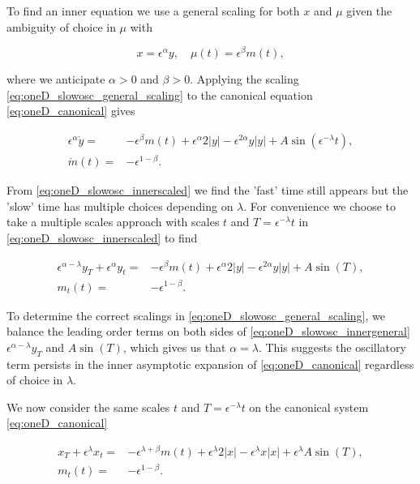 To find an inner equation we use a general scaling for both $x$ and $\mu$ given the ambiguity of choice in $\mu$ with

\begin{equation}\label{eq:oneD_slowosc_general_scaling}
x=\epsilon^\alpha y ,\quad \mu(t)=\epsilon^\beta m(t),
\end{equation}

where we anticipate $\alpha>0$ and $\beta>0$. Applying the scaling \eqref{eq:oneD_slowosc_general_scaling} to the canonical equation \eqref{eq:oneD_canonical} gives

\begin{equation}\label{eq:oneD_slowosc_innerscaled}
\begin{aligned}
\epsilon^\alpha \dot{y}=& -\epsilon^\beta m(t)+\epsilon^\alpha 2|y| - \epsilon^{2\alpha}y|y| +A\sin(\epsilon^{-\lambda}t),\\
\dot{m}(t)=&-\epsilon^{1-\beta}.
\end{aligned}
\end{equation}

From \eqref{eq:oneD_slowosc_innerscaled} we find the 'fast' time still appears but the 'slow' time has multiple choices depending on $\lambda$. For convenience we choose to take a multiple scales approach with scales $t$ and $T=\epsilon^{-\lambda}t$ in \eqref{eq:oneD_slowosc_innerscaled} to find

\begin{equation}\label{eq:oneD_slowosc_innergeneral}
\begin{aligned}
\epsilon^{\alpha-\lambda} y_T+\epsilon^{\alpha}y_t=& -\epsilon^{\beta}m(t)+\epsilon^{\alpha}2|y|-\epsilon^{2\alpha}y|y|+A\sin(T),\\
m_t(t)=&-\epsilon^{1-\beta}.
\end{aligned}
\end{equation}

To determine the correct scalings in \eqref{eq:oneD_slowosc_general_scaling}, we balance the leading order terms on both sides of \eqref{eq:oneD_slowosc_innergeneral} $\epsilon^{\alpha-\lambda}y_T$ and $A\sin(T)$, which gives us that $\alpha=\lambda$. This suggests the oscillatory term persists in the inner asymptotic expansion of \eqref{eq:oneD_canonical} regardless of choice in $\lambda$.

We now consider the same scales $t$ and $T=\epsilon^{-\lambda}t$ on the canonical system \eqref{eq:oneD_canonical} 

\begin{equation}\label{eq:oneD_slowosc_general_outermulti}
\begin{aligned}
x_T+\epsilon^{\lambda}x_t =& -\epsilon^{\lambda+\beta}m(t)+\epsilon^{\lambda}2|x|-\epsilon^{\lambda}x|x|+\epsilon^{\lambda}A\sin(T),\\
m_t(t) =&-\epsilon^{1-\beta}.
\end{aligned}
\end{equation}

